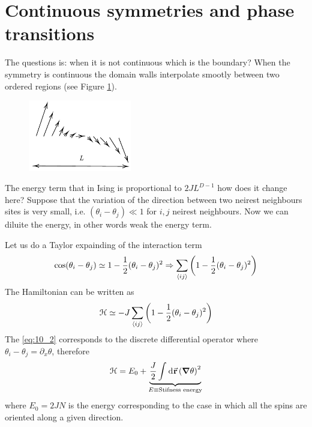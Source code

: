 \documentclass[../main/main.tex]{subfiles}
\begin{document}
\section{Continuous symmetries and phase transitions}
The questions is: when it is not continuous which is the boundary?
When the symmetry is continuous the domain walls interpolate smootly between two ordered regions (see Figure \ref{fig:10_3}).

\begin{figure}[h!]
\centering
\includegraphics[width=0.4\textwidth]{../lessons/10_image/3.pdf}
\caption{\label{fig:10_3} }
\end{figure}
The energy term that in Ising is proportional to \( 2JL^{D-1} \) how does it change here?
Suppose that the variation of the direction between two neirest neighbours sites is very small, i.e. \( (\theta _i - \theta _j) \ll 1 \) for \( i,j \) neirest neighbours.
 Now we can diluite the energy, in other words weak the energy term.

Let us do a Taylor expainding of the interaction term
\begin{equation}
  \cos (\theta _i - \theta _j) \simeq 1 - \frac{1}{2} (\theta _i - \theta _j)^2 \Rightarrow \sum_{\expval{ij} }^{}  \qty(1 - \frac{1}{2} (\theta _i - \theta _j)^2)
  \label{eq:10_2}
\end{equation}
The Hamiltonian can be written as
\begin{equation}
  \mathcal{H} \simeq - J \sum_{\expval{ij} }^{} \qty(1- \frac{1}{2}(\theta _i - \theta _j)^2)
\end{equation}
The \eqref{eq:10_2} corresponds to the discrete differential operator where
\( \theta _i - \theta _j = \partial_x{\theta }  \),
therefore
\begin{equation}
  \mathcal{H} = E_0 + \underbrace{\frac{J}{2} \int_{}^{} \dd[]{\va{r}} \qty(\grad \theta )^2 }_{E \equiv \text{Stifness energy}}
\end{equation}
where \( E_0 = 2JN \) is the energy corresponding to the case in which all the spins are oriented along a given direction.
\end{document}
